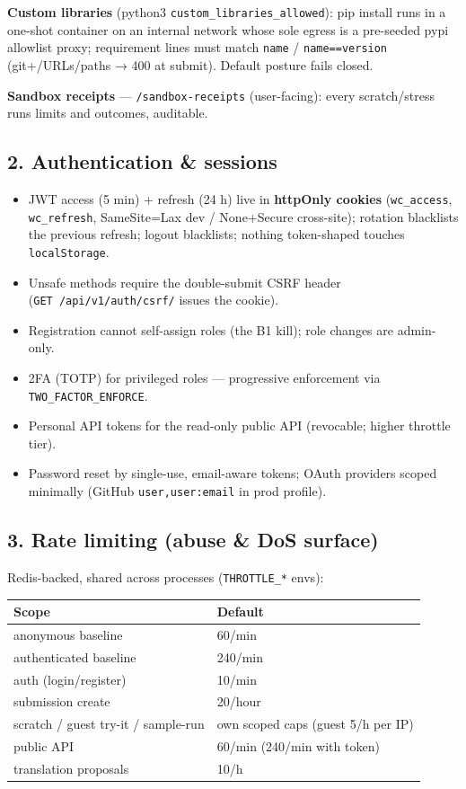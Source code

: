 \documentclass[
]{article}
\newcounter{none} %
\providecommand{\tightlist}{%
  \setlength{\itemsep}{0pt}\setlength{\parskip}{0pt}}
\begin{document}
\textbf{Custom libraries} (python3 \texttt{custom\_libraries\_allowed}):
pip install runs in a one-shot container on an internal network whose
sole egress is a pre-seeded pypi allowlist proxy; requirement lines must
match \texttt{name} / \texttt{name==version} (git+/URLs/paths → 400 at
submit). Default posture fails closed.

\textbf{Sandbox receipts} --- \texttt{/sandbox-receipts} (user-facing):
every scratch/stress run\textquotesingle s limits and outcomes,
auditable.

\subsection{2. Authentication \&
sessions}\label{2-authentication--sessions}

\begin{itemize}
\tightlist
\item
  JWT access (5 min) + refresh (24 h) live in \textbf{httpOnly cookies}
  (\texttt{wc\_access}, \texttt{wc\_refresh}, SameSite=Lax dev /
  None+Secure cross-site); rotation blacklists the previous refresh;
  logout blacklists; nothing token-shaped touches \texttt{localStorage}.
\item
  Unsafe methods require the double-submit CSRF header
  (\texttt{GET\ /api/v1/auth/csrf/} issues the cookie).
\item
  Registration cannot self-assign roles (the B1 kill); role changes are
  admin-only.
\item
  2FA (TOTP) for privileged roles --- progressive enforcement via
  \texttt{TWO\_FACTOR\_ENFORCE}.
\item
  Personal API tokens for the read-only public API (revocable; higher
  throttle tier).
\item
  Password reset by single-use, email-aware tokens; OAuth providers
  scoped minimally (GitHub \texttt{user,user:email} in prod profile).
\end{itemize}

\subsection{3. Rate limiting (abuse \& DoS
surface)}\label{3-rate-limiting-abuse--dos-surface}

Redis-backed, shared across processes (\texttt{THROTTLE\_*} envs):

{\def\LTcaptype{none} %
\begin{longtable}[]{@{}ll@{}}
\toprule\noalign{}
Scope & Default \\
\midrule\noalign{}
\endhead
\bottomrule\noalign{}
\endlastfoot
anonymous baseline & 60/min \\
authenticated baseline & 240/min \\
auth (login/register) & 10/min \\
submission create & 20/hour \\
scratch / guest try-it / sample-run & own scoped caps (guest 5/h per
IP) \\
public API & 60/min (240/min with token) \\
translation proposals & 10/h \\
\end{longtable}
}
\end{document}
